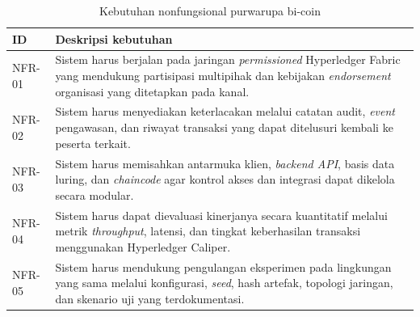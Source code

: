 \begin{table}[H]
    \caption{Kebutuhan nonfungsional purwarupa bi-coin}
    \label{tab:srs-nonfungsional}
    \centering
    \small
    \begin{tabular}{@{}p{1.7cm}p{9.6cm}@{}}
        \toprule
        \textbf{ID} & \textbf{Deskripsi kebutuhan} \\
        \midrule
        NFR-01 & Sistem harus berjalan pada jaringan \textit{permissioned} Hyperledger Fabric yang mendukung partisipasi multipihak dan kebijakan \textit{endorsement} organisasi yang ditetapkan pada kanal. \\
        NFR-02 & Sistem harus menyediakan keterlacakan melalui catatan audit, \textit{event} pengawasan, dan riwayat transaksi yang dapat ditelusuri kembali ke peserta terkait. \\
        NFR-03 & Sistem harus memisahkan antarmuka klien, \textit{backend API}, basis data luring, dan \textit{chaincode} agar kontrol akses dan integrasi dapat dikelola secara modular. \\
        NFR-04 & Sistem harus dapat dievaluasi kinerjanya secara kuantitatif melalui metrik \textit{throughput}, latensi, dan tingkat keberhasilan transaksi menggunakan Hyperledger Caliper. \\
        NFR-05 & Sistem harus mendukung pengulangan eksperimen pada lingkungan yang sama melalui konfigurasi, \textit{seed}, hash artefak, topologi jaringan, dan skenario uji yang terdokumentasi. \\
        \bottomrule
    \end{tabular}
\end{table}

